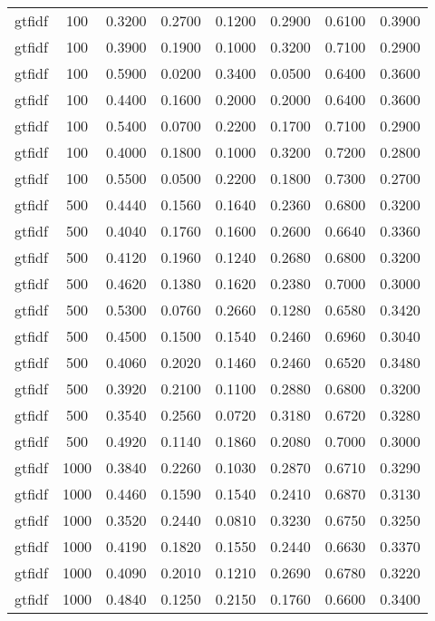 \begin{table}[h!]
\begin{tabularx}{\textwidth}{cccccccc}
		gtfidf   & 100  & 0.3200 & 0.2700 & 0.1200 & 0.2900 & 0.6100 & 0.3900 \\
		gtfidf   & 100  & 0.3900 & 0.1900 & 0.1000 & 0.3200 & 0.7100 & 0.2900 \\
		gtfidf   & 100  & 0.5900 & 0.0200 & 0.3400 & 0.0500 & 0.6400 & 0.3600 \\
		gtfidf   & 100  & 0.4400 & 0.1600 & 0.2000 & 0.2000 & 0.6400 & 0.3600 \\
		gtfidf   & 100  & 0.5400 & 0.0700 & 0.2200 & 0.1700 & 0.7100 & 0.2900 \\
		gtfidf   & 100  & 0.4000 & 0.1800 & 0.1000 & 0.3200 & 0.7200 & 0.2800 \\
		gtfidf   & 100  & 0.5500 & 0.0500 & 0.2200 & 0.1800 & 0.7300 & 0.2700 \\
		gtfidf   & 500  & 0.4440 & 0.1560 & 0.1640 & 0.2360 & 0.6800 & 0.3200 \\
		gtfidf   & 500  & 0.4040 & 0.1760 & 0.1600 & 0.2600 & 0.6640 & 0.3360 \\
		gtfidf   & 500  & 0.4120 & 0.1960 & 0.1240 & 0.2680 & 0.6800 & 0.3200 \\
		gtfidf   & 500  & 0.4620 & 0.1380 & 0.1620 & 0.2380 & 0.7000 & 0.3000 \\
		gtfidf   & 500  & 0.5300 & 0.0760 & 0.2660 & 0.1280 & 0.6580 & 0.3420 \\
		gtfidf   & 500  & 0.4500 & 0.1500 & 0.1540 & 0.2460 & 0.6960 & 0.3040 \\
		gtfidf   & 500  & 0.4060 & 0.2020 & 0.1460 & 0.2460 & 0.6520 & 0.3480 \\
		gtfidf   & 500  & 0.3920 & 0.2100 & 0.1100 & 0.2880 & 0.6800 & 0.3200 \\
		gtfidf   & 500  & 0.3540 & 0.2560 & 0.0720 & 0.3180 & 0.6720 & 0.3280 \\
		gtfidf   & 500  & 0.4920 & 0.1140 & 0.1860 & 0.2080 & 0.7000 & 0.3000 \\
		gtfidf   & 1000 & 0.3840 & 0.2260 & 0.1030 & 0.2870 & 0.6710 & 0.3290 \\
		gtfidf   & 1000 & 0.4460 & 0.1590 & 0.1540 & 0.2410 & 0.6870 & 0.3130 \\
		gtfidf   & 1000 & 0.3520 & 0.2440 & 0.0810 & 0.3230 & 0.6750 & 0.3250 \\
		gtfidf   & 1000 & 0.4190 & 0.1820 & 0.1550 & 0.2440 & 0.6630 & 0.3370 \\
		gtfidf   & 1000 & 0.4090 & 0.2010 & 0.1210 & 0.2690 & 0.6780 & 0.3220 \\
		gtfidf   & 1000 & 0.4840 & 0.1250 & 0.2150 & 0.1760 & 0.6600 & 0.3400 \\

\end{tabularx}
\end{table}
